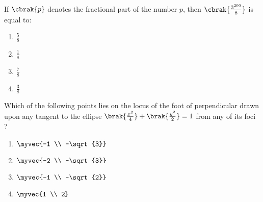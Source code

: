 \item  If $\cbrak{p}$ denotes the fractional part of the number $p$, then $\cbrak{\frac{3^{200}}{8}}$ is equal to:

\hfill{}
\begin{multicols}{4}
\begin{enumerate}
\item $\frac{5}{8}$
\item $\frac{1}{8}$
\item $\frac{7}{8}$
\item $\frac{3}{8}$
\end{enumerate}
\end{multicols}

\item  Which of the following points lies on the locus of the foot of perpendicular drawn upon any tangent to the ellipse $\brak{\frac{x^2}{4}}+\brak{\frac{y^2}{2}} = 1$ from any of its foci ?

\hfill{}


\begin{multicols}{4}
\begin{enumerate}
\item $\myvec{-1 \\ -\sqrt{3}}$
\item $\myvec{-2 \\ -\sqrt{3}}$
\item $\myvec{-1 \\ -\sqrt{2}}$
\item $\myvec{1 \\ 2}$
\end{enumerate}
\end{multicols}




